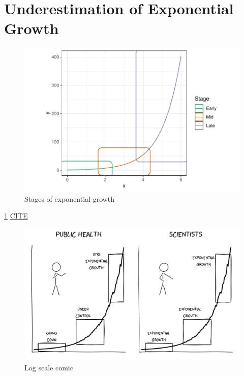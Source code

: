\documentclass[print]{nuthesis}
\begin{document}
\hypertarget{underestimation}{%
\section{Underestimation of Exponential Growth}\label{underestimation}}


\begin{figure}[tbp]

{\centering \includegraphics[width=0.75\linewidth,]{thesis_files/figure-latex/exponential-stages-1} 

}

\caption{Stages of exponential growth}\label{fig:exponential-stages}
\end{figure}

\cref{fig:exponential-stages} \href{https://twitter.com/MDrelichman/status/1402054093284143104}{CITE}

\begin{figure}[tbp]

{\centering \includegraphics[width=0.7\linewidth,]{images/exponential-stages-comic} 

}

\caption{Log scale comic}\label{fig:exponential-stages-comic}
\end{figure}
\end{document}
